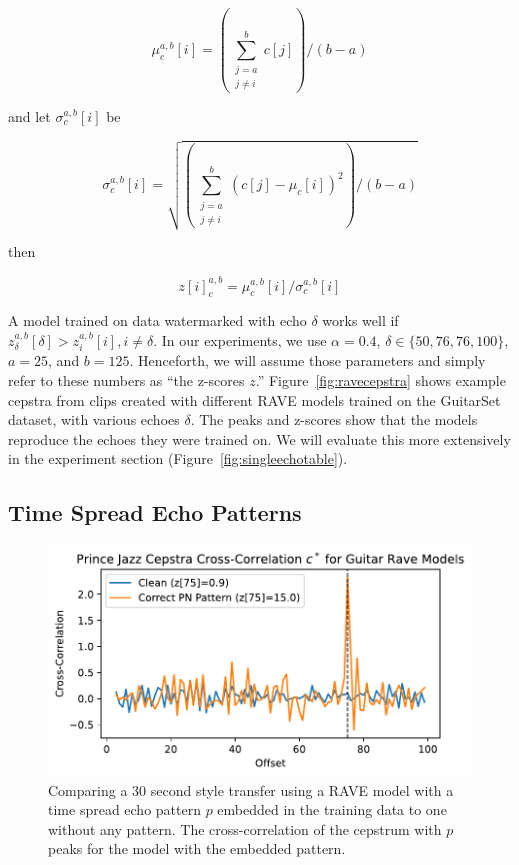 \documentclass[letterpaper]{article} %
\begin{document}
\begin{equation}
    \mu_{c}^{a,b}[i] = \left( \sum_{\substack{j=a \\ j \neq i}}^{b} c[j] \right) / (b-a)
\end{equation}

and let $\sigma_{c}^{a,b}[i]$ be 

\begin{equation}
    \sigma_{c}^{a,b}[i] = \sqrt{ \left( \sum_{\substack{j=a \\ j \neq i}}^{b} (c[j] - \mu_c[i])^2 \right) / (b-a)}
\end{equation}

then

\begin{equation}
    \label{eq:zscore}
    z[i]_{c}^{a,b} = \mu_{c}^{a,b}[i] / \sigma_{c}^{a,b}[i]
\end{equation}


A model trained on data watermarked with echo $\delta$ works well if $z^{a,b}_{\delta}[\delta] > z^{a,b}_{i}[i], i \neq \delta$.  In our experiments, we use $\alpha = 0.4$, $\delta \in \{50, 76, 76, 100\}$, $a=25$, and $b=125$.  Henceforth, we will assume those parameters and simply refer to these numbers as ``the z-scores $z$.''  Figure~\ref{fig:ravecepstra} shows example cepstra from clips created with different RAVE\cite{caillon2021rave} models trained on the GuitarSet \cite{xi2018guitarset} dataset, with various echoes $\delta$.  The peaks and z-scores show that the models reproduce the echoes they were trained on.  We will evaluate this more extensively in the experiment section (Figure~\ref{fig:singleechotable}).

\subsection{Time Spread Echo Patterns}

\begin{figure}
    \centering
    \includegraphics[width=\columnwidth]{figs/RavePNCepstra.pdf}
    \caption{Comparing a 30 second style transfer using a RAVE model with a time spread echo pattern $p$ embedded in the training data to one without any pattern.  The cross-correlation of the cepstrum with $p$ peaks for the model with the embedded pattern. }
    \label{fig:ravepncepstra}
\end{figure}
\end{document}
